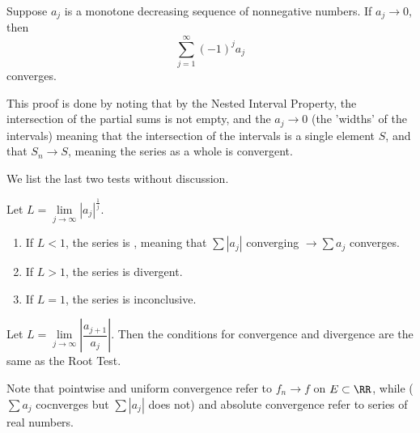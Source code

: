 \begin{theorem}
	Suppose $a_j$ is a monotone decreasing sequence of nonnegative numbers. If $a_j \to 0$, then 
	\[ \sum_{j=1}^\infty (-1)^ja_j \] converges. 
\end{theorem}
This proof is done by noting that by the Nested Interval Property, the intersection of the partial sums is not empty, and the $a_j \to 0$ (the 'widths' of the intervals) meaning that the intersection of the intervals is a single element $S$, and that $S_n \to S$, meaning the series as a whole is convergent. 

We list the last two tests without discussion. 
\begin{theorem}
	Let $L = \lim\limits_{j \to \infty} |a_j|^{\frac{1}{j}}$. 
	\begin{enumerate}
		\item If $L <1$, the series is , meaning that $\sum |a_j|$ converging $\rightarrow \sum a_j$ converges. 
		\item If $L > 1$, the series is divergent. 
		\item If $L = 1$, the series is inconclusive. 
	\end{enumerate}
\end{theorem}

\begin{theorem}
	Let $L = \lim\limits_{j\to \infty} \left |\dfrac{a_{j+1}}{a_j} \right |$. Then the conditions for convergence and divergence are the same as the Root Test. 
\end{theorem}

Note that pointwise and uniform convergence refer to $f_n \to f$ on $E \subset \RR$, while  ($\sum a_j$ cocnverges but $\sum |a_j|$ does not) and absolute convergence refer to series of real numbers. 

\newpage

